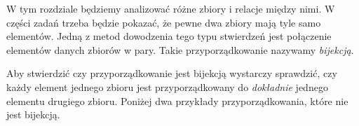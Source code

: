 



\noindent
W tym rozdziale będziemy analizować różne zbiory i relacje między nimi. W części zadań trzeba będzie pokazać, że pewne dwa zbiory mają tyle samo elementów. Jedną z metod dowodzenia tego typu stwierdzeń jest połączenie elementów danych zbiorów w pary. Takie przyporządkowanie nazywamy \textit{bijekcją}.

\begin{center}
\end{center}

\vspace{10px}

\noindent
Aby stwierdzić czy przyporządkowanie jest bijekcją wystarczy sprawdzić, czy każdy element jednego zbioru jest przyporządkowany do \textit{dokładnie} jednego elementu drugiego zbioru. Poniżej dwa przykłady przyporządkowania, które nie jest bijekcją.

